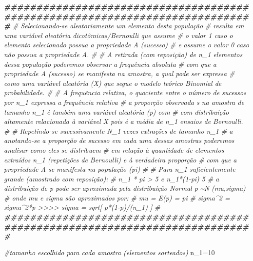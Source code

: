 \documentclass[
]{book}
\newenvironment{Shaded}{\begin{snugshade}}{\end{snugshade}}
\newcommand{\CommentTok}[1]{\textcolor[rgb]{0.56,0.35,0.01}{\textit{#1}}}
\newcommand{\DecValTok}[1]{\textcolor[rgb]{0.00,0.00,0.81}{#1}}
\newcommand{\DocumentationTok}[1]{\textcolor[rgb]{0.56,0.35,0.01}{\textbf{\textit{#1}}}}
\newcommand{\NormalTok}[1]{#1}
\newcommand{\OtherTok}[1]{\textcolor[rgb]{0.56,0.35,0.01}{#1}}
\begin{document}
\begin{Shaded}
\begin{Highlighting}[]
\DocumentationTok{\#\#\#\#\#\#\#\#\#\#\#\#\#\#\#\#\#\#\#\#\#\#\#\#\#\#\#\#\#\#\#\#\#\#\#\#\#\#\#\#\#\#\#\#\#\#\#\#\#\#\#\#\#\#\#\#\#\#\#\#\#\#\#\#\#\#\#\#\#\#\#\#\#\#\#\#\#}
\CommentTok{\# Selecionando{-}se aleatoriamente um elemento desta população }
\CommentTok{\# resulta em uma variável aleatória dicotômicas/Bernoulli que assume }
\CommentTok{\# o valor 1 caso o elemento selecionado possua a propriedade A (sucesso)}
\CommentTok{\# e assume o valor 0 caso não possua a propriedade A.}
\CommentTok{\#}
\CommentTok{\# A retirada (com reposição) de \textasciigrave{}n\_1\textasciigrave{} elementos dessa população poderemos observar a frequência absoluta }
\CommentTok{\# com que a propriedade A (sucesso) se manifesta na amostra, a qual pode ser expressa }
\CommentTok{\# como uma variável aleatória (X) que segue o modelo teórico  Binomial de probabilidade. }
\CommentTok{\# }
\CommentTok{\# A frequência relativa, o quociente entre o número de sucessos por \textasciigrave{}n\_1\textasciigrave{} expressa a frequência relativa}
\CommentTok{\# a proporção observada s na amostra de tamanho \textasciigrave{}n\_1\textasciigrave{} é também uma variável aleatória (p) com }
\CommentTok{\# com distribuição altamente relacionada à variável X  pois é a média de \textasciigrave{}n\_1\textasciigrave{} ensaios de Bernoulli.}
\CommentTok{\# }
\CommentTok{\# Repetindo{-}se sucessivamente  \textasciigrave{}N\_1\textasciigrave{} vezes extrações de tamanho \textasciigrave{}n\_1\textasciigrave{} }
\CommentTok{\# a anotando{-}se a proporção de sucesso em cada uma dessas amostras poderemos analisar como eles se distribuem }
\CommentTok{\# em relação à quantidade de elementos extraídos \textasciigrave{}n\_1\textasciigrave{} (repetições de Bernoulli) e à verdadeira proporção}
\CommentTok{\# com que a propriedade A se manifesta na população (pi)  }
\CommentTok{\#}
\CommentTok{\# Para \textasciigrave{}n\_1\textasciigrave{} suficientemente grande (amostrado com reposição):}
\CommentTok{\# n\_1 * pi \textgreater{} 5 e n\_1*(1{-}pi) 5}
\CommentTok{\# a distribuição de p pode ser aproximada pela distribuição Normal p \textasciitilde{}N (mu,sigma)}
\CommentTok{\# onde mu e sigma são aproximados por:}
\CommentTok{\# mu = E(p) = pi}
\CommentTok{\# sigma\^{}2 = sigma\^{}2*p \textgreater{}\textgreater{}\textgreater{}\textgreater{} sigma = sqrt[ p*(1{-}p)/(n\_1)  ]}
\CommentTok{\# }
\DocumentationTok{\#\#\#\#\#\#\#\#\#\#\#\#\#\#\#\#\#\#\#\#\#\#\#\#\#\#\#\#\#\#\#\#\#\#\#\#\#\#\#\#\#\#\#\#\#\#\#\#\#\#\#\#\#\#\#\#\#\#\#\#\#\#\#\#\#\#\#\#\#\#\#\#\#\#\#\#\#}

\CommentTok{\#tamanho escolhido para cada amostra (elementos sorteados)}
\NormalTok{n\_1}\OtherTok{=}\DecValTok{10}



\end{Highlighting}
\end{Shaded}
\end{document}
